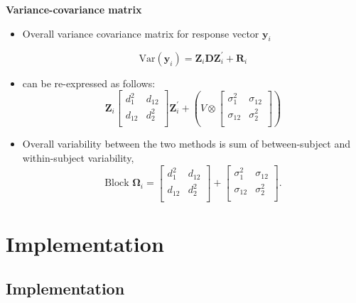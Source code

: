 \documentclass[compress]{beamer}        %
\makeatletter
\newcommand{\tcb}{\textcolor{beamer@blendedblue}}
\makeatother
\begin{document}
		
		
		\begin{frame}{\bf \tcb{Variance-covariance matrix}}
			\begin{itemize}
				\item Overall variance covariance matrix for response vector $\boldsymbol{y}_i$
				
				\[ \mbox{Var}(\boldsymbol{y}_i)= \boldsymbol{Z}_i \boldsymbol{D}\boldsymbol{Z}^{\prime}_i + \boldsymbol{R}_i \]
				
				\item can be re-expressed as follows:
				\[\boldsymbol{Z}_i \left[ \begin{array}{cc} d^2_1 & d_{12}\\
				d_{12} & d^2_2\\ \end{array}\right]\boldsymbol{Z}^{\prime}_i  +  \left(V \otimes \left[\begin{array}{cc} \sigma^2_1 & \sigma_{12}\\
				\sigma_{12} & \sigma^2_2\\ \end{array}\right] \right)
				\]
				
				\item Overall variability between the two methods is sum of between-subject and within-subject variability,
				\[
				\mbox{Block } \boldsymbol{\Omega}_i = \left[ \begin{array}{cc} d^2_1 & d_{12}\\ d_{12} & d^2_2\\ \end{array} \right]
				+ \left[\begin{array}{cc} \sigma^2_1 & \sigma_{12}\\ \sigma_{12} & \sigma^2_2\\ \end{array}\right].
				\]
				
			\end{itemize}
		\end{frame}
		
		
		
		\section[Implementation]{Implementation}
		\subsection{Implementation}
		
\end{document}
